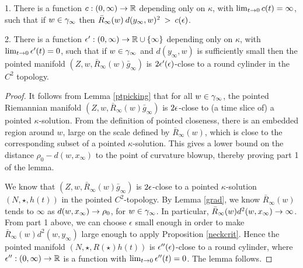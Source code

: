 \begin{lemma}
  \label{lem:kl-canonical-neighborhood-theorem-existence-canonical-neighborhoods-10}

\label{nearlyround}
1. There is a function $c:(0,\infty)\rightarrow {\mathbb R}$ depending only
on $\kappa$, with
$\lim_{t\rightarrow 0}c(t)=\infty$, such that if $w\in\gamma_\infty$ then
$\bar R_\infty(w) \: d(y_\infty,w)^2 \: > \: c(\epsilon)$.

2. There is a function $\epsilon':(0,\infty)\rightarrow {\mathbb R}\cup \{\infty\}$ depending only
on $\kappa$, with $\lim_{t\rightarrow 0}\epsilon'(t)=0$, such that if
$w\in \gamma_\infty$ and $d(y_\infty,w)$ is sufficiently small
then the pointed manifold $(Z,w, \bar R_\infty(w)\bar g_\infty)$ is
$2\epsilon^\prime(\epsilon)$-close to a round cylinder in the $C^2$ topology.
\end{lemma}
\begin{proof}
It follows from Lemma \ref{ptpicking} that
for all $w\in \gamma_\infty$, the pointed Riemannian
manifold
$(Z,w,\bar R_\infty(w)\bar g_\infty)$ is $2\epsilon$-close
to (a time slice of) a pointed $\kappa$-solution.
From the definition of pointed closeness, there is an
embedded region around $w$, large on the scale defined by
$\bar R_\infty(w)$, which is close to the corresponding subset of
a pointed $\kappa$-solution.  This gives a lower bound on
the distance $\rho_0-d(w,x_\infty)$ to the point of curvature
blowup, thereby proving part 1 of the lemma.

We know that $(Z,w, \bar R_\infty(w) \bar g_\infty)$ is $2\epsilon$-close to
a pointed $\kappa$-solution $(N,\star,h(t))$ in the pointed
$C^2$-topology.   By Lemma \ref{grad},
we know  $\bar R_\infty(w)$ tends to $\infty$
as $d(w,x_\infty)\rightarrow\rho_0$, for $w\in\gamma_\infty$.
In particular, $\bar R_\infty(w)d^2(w,x_\infty)\rightarrow \infty$.
From part 1 above, we can choose $\epsilon$ small enough in order to
make
$\bar R_\infty(w)d^2(w,y_\infty)$ large enough to apply Proposition
\ref{neckcrit}. Hence the pointed
manifold $(N,\star,R(\star)h(t))$ is $\epsilon^{\prime \prime}(\epsilon)$-close to
a round cylinder, where $\epsilon^{\prime \prime}:(0,\infty)\rightarrow{\mathbb R}$ is a function with
$\lim_{t\rightarrow 0}\epsilon^{\prime \prime}(t)=0$. The lemma follows.
\end{proof}


